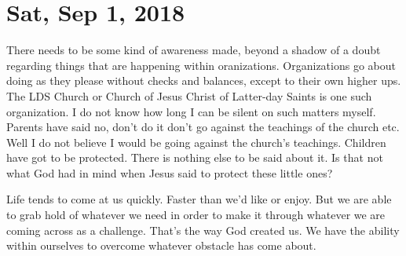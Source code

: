 \section{Sat, Sep 1, 2018}

There needs to be some kind of awareness made, beyond a shadow of a doubt regarding
things that are happening within oranizations. Organizations go about doing as they
please without checks and balances, except to their own higher ups. The LDS Church or
Church of Jesus Christ of Latter-day Saints is one such organization. I do not know
how long I can be silent on such matters myself. Parents have said no, don't do it
don't go against the teachings of the church etc. Well I do not believe I would be
going against the church's teachings. Children have got to be protected. There is
nothing else to be said about it. Is that not what God had in mind when Jesus said to
protect these little ones?

Life tends to come at us quickly. Faster than we'd like or enjoy. But we are able to
grab hold of whatever we need in order to make it through whatever we are coming
across as a challenge. That's the way God created us. We have the ability within
ourselves to overcome whatever obstacle has come about.